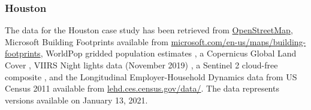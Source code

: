 \subsubsection{Houston}

The data for the Houston case study has been retrieved from
\href{https://osm.org}{OpenStreetMap}, Microsoft Building Footprints available from
\href{https://www.microsoft.com/en-us/maps/building-footprints}{microsoft.com/en-us/maps/building-footprints},
WorldPop gridded population estimates
\citep{bondarenko2020census}, a Copernicus Global Land Cover
\citep{marcel_buchhorn_2020_3939050}, VIIRS Night lights data (November 2019) \citep{elvidge2013viirs}, a Sentinel 2 cloud-free composite \citep{CORBANE2020105737}, and
the Longitudinal Employer-Household Dynamics data from US Census 2011 available from
\href{https://lehd.ces.census.gov/data/}{lehd.ces.census.gov/data/}. The data represents
versions available on January 13, 2021.

